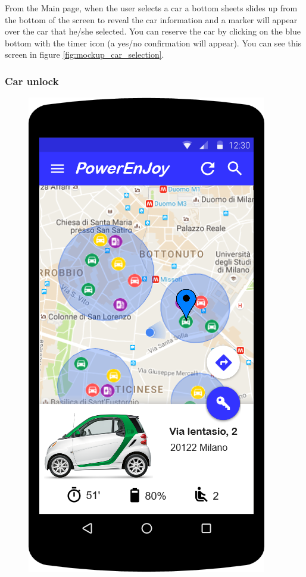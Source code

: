 From the Main page, when the user selects a car a bottom sheets slides up from the bottom of the screen to reveal the car information and a marker will appear over the car that he/she selected. You can reserve the car by clicking on the blue bottom with the timer icon (a yes/no confirmation will appear). You can see this screen in figure \ref{fig:mockup_car_selection}.

\subsubsection*{Car unlock}

\begin{figure}
	\centering
	\includegraphics[width=\textwidth,height=\dimexpr\textheight-4\baselineskip-\abovecaptionskip-\belowcaptionskip\relax,keepaspectratio]{overall_description/mockup/car_unlock.png}

\end{figure}

